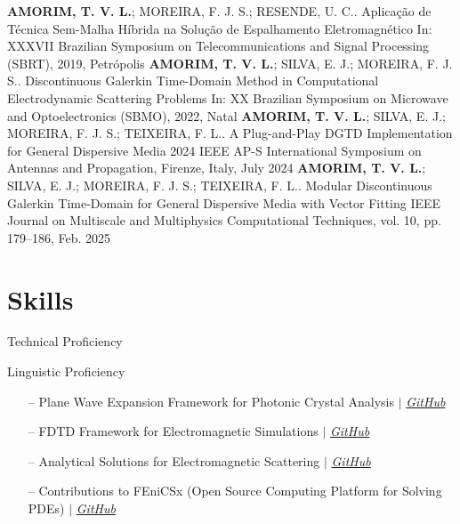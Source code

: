 \documentclass{cv}
\begin{document}
\begin{Publications}
    \publicationitem
    {\textbf{AMORIM, T. V. L.}; MOREIRA, F. J. S.; RESENDE, U. C..
        Aplicação de Técnica Sem-Malha Híbrida na Solução de Espalhamento
    Eletromagnético}
    {In: XXXVII Brazilian Symposium on Telecommunications and Signal
    Processing (SBRT), 2019, Petrópolis}
    \publicationitem
    {\textbf{AMORIM, T. V. L.}; SILVA, E. J.; MOREIRA, F. J. S..
        Discontinuous Galerkin Time-Domain Method in Computational
    Electrodynamic Scattering Problems}
    {In: XX Brazilian Symposium on Microwave and Optoelectronics
    (SBMO), 2022, Natal}
    \publicationitem
    {\textbf{AMORIM, T. V. L.}; SILVA, E. J.; MOREIRA, F. J. S.;
        TEIXEIRA, F. L.. A Plug-and-Play DGTD Implementation for General
    Dispersive Media}
    {2024 IEEE AP-S International Symposium on Antennas and
    Propagation, Firenze, Italy, July 2024}
    \publicationitem
    {\textbf{AMORIM, T. V. L.}; SILVA, E. J.; MOREIRA, F. J. S.;
        TEIXEIRA, F. L.. Modular Discontinuous Galerkin Time-Domain for
    General Dispersive Media with Vector Fitting}
    {IEEE Journal on Multiscale and Multiphysics Computational
    Techniques, vol. 10, pp. 179--186, Feb. 2025}
\end{Publications}

\section{Skills}
Technical Proficiency \vspace{-6pt}
\begin{itemize}
\end{itemize}
Linguistic Proficiency \vspace{-6pt}
\begin{itemize}
\end{itemize}

\begin{itemize}[leftmargin=10pt, itemsep=0pt]
    \item[--] Plane Wave Expansion Framework for Photonic Crystal Analysis
        $|$
        \emph{\href{https://github.com/tiagovla/morpho.py}{\color{blue}GitHub}}
    \item[--] FDTD Framework for Electromagnetic Simulations
        $|$
        \emph{\href{https://github.com/tiagovla/fdtd.py}{\color{blue}GitHub}}
    \item[--] Analytical Solutions for Electromagnetic Scattering
        $|$
        \emph{\href{https://github.com/tiagovla/scatsol}{\color{blue}GitHub}}
    \item[--] Contributions to FEniCSx (Open Source Computing
        Platform for Solving PDEs)
        $|$ \emph{\href{https://github.com/FEniCS}{\color{blue}GitHub}}
\end{itemize}
\end{document}
